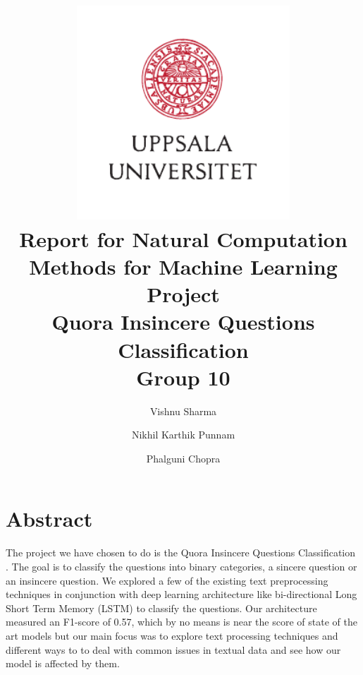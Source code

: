 \documentclass[oneside,a4paper]{article}
\title{
	\includegraphics[width=0.6\textwidth]{UU_logo.pdf}\\[1em]
	Report for Natural Computation Methods for Machine Learning\\[1em]
	Project\\[3em]
	Quora Insincere Questions Classification\\[3em]
	Group 10
}
\author{
    Vishnu Sharma\and
	Nikhil Karthik Punnam\and
	Phalguni Chopra
}
\begin{document}
\maketitle
\thispagestyle{empty} %
\pagebreak

\section *{Abstract}

The project we have chosen to do is the Quora Insincere Questions Classification \cite{QuoraKaggle}. The goal is to classify the questions into binary categories, a sincere question or an insincere question. We explored a few of the existing text preprocessing techniques in conjunction with deep learning architecture like bi-directional Long Short Term Memory (LSTM) to classify the questions. Our architecture measured an F1-score of 0.57, which by no means is near the score of state of the art models but our main focus was to explore text processing techniques and different ways to to deal with common issues in textual data and see how our model is affected by them.










\pagebreak


\end{document}

